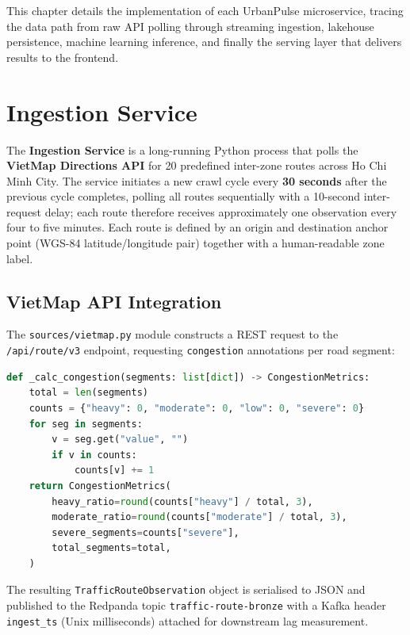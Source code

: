This chapter details the implementation of each UrbanPulse microservice, tracing
the data path from raw API polling through streaming ingestion, lakehouse
persistence, machine learning inference, and finally the serving layer that
delivers results to the frontend.

\section{Ingestion Service}
\label{sec:impl-ingestion}

The \textbf{Ingestion Service} is a long-running Python process that polls the
\textbf{VietMap Directions API} for 20 predefined inter-zone routes across
Ho Chi Minh City. The service initiates a new crawl cycle every \textbf{30 seconds}
after the previous cycle completes, polling all routes sequentially with a
10-second inter-request delay; each route therefore receives approximately one
observation every four to five minutes. Each route is defined by an origin
and destination anchor point (WGS-84 latitude/longitude pair) together with
a human-readable zone label.

\subsection{VietMap API Integration}

The \texttt{sources/vietmap.py} module constructs a REST request to the
\texttt{/api/route/v3} endpoint, requesting \texttt{congestion} annotations
per road segment:

\begin{lstlisting}[language=Python,
  caption={VietMap congestion metric extraction.},
  label={lst:vietmap}]
def _calc_congestion(segments: list[dict]) -> CongestionMetrics:
    total = len(segments)
    counts = {"heavy": 0, "moderate": 0, "low": 0, "severe": 0}
    for seg in segments:
        v = seg.get("value", "")
        if v in counts:
            counts[v] += 1
    return CongestionMetrics(
        heavy_ratio=round(counts["heavy"] / total, 3),
        moderate_ratio=round(counts["moderate"] / total, 3),
        severe_segments=counts["severe"],
        total_segments=total,
    )
\end{lstlisting}

\noindent The resulting \texttt{TrafficRouteObservation} object is serialised to
JSON and published to the Redpanda topic \texttt{traffic-route-bronze} with a
Kafka header \texttt{ingest\_ts} (Unix milliseconds) attached for downstream
lag measurement.

